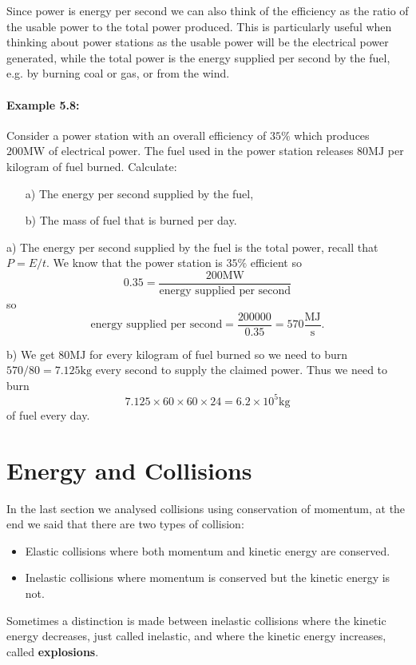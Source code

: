 \documentclass[a4paper,12pt]{book}
\begin{document}
Since power is energy per second we can also think of the efficiency as the ratio of the usable power to the total power produced. This is particularly useful when thinking about power stations as the usable power will be the electrical power generated, while the total power is the energy supplied per second by the fuel, e.g. by burning coal or gas, or from the wind.

\paragraph{Example 5.8:} Consider a power station with an overall efficiency of $35\%$ which produces $200\text{MW}$ of electrical power. The fuel used in the power station releases $80\text{MJ}$ per kilogram of fuel burned. Calculate:
\begin{itemize}
\setlength{\itemsep}{-5pt}
    \item[a)] The energy per second supplied by the fuel,
    \item[b)] The mass of fuel that is burned per day.
\end{itemize} 

a) The energy per second supplied by the fuel is the total power, recall that $P=E/t$. We know that the power station is $35\%$ efficient so
\begin{equation*}
0.35=\frac{200\text{MW}}{\text{energy supplied per second}}
\end{equation*}
so
\begin{equation*}
\text{energy supplied per second}=\frac{200000}{0.35}=570\frac{\text{MJ}}{\text{s}}.
\end{equation*}

b) We get $80\text{MJ}$ for every kilogram of fuel burned so we need to burn $570/80=7.125\text{kg}$ every second to supply the claimed power. Thus we need to burn 
\begin{equation*}
7.125\times 60\times 60\times 24=6.2\times10^{5}\text{kg}
\end{equation*}
of fuel every day.


\section{Energy and Collisions}
In the last section we analysed collisions using conservation of momentum, at the end we said that there are two types of collision:
\begin{itemize}
\setlength{\itemsep}{-5pt}
    \item Elastic collisions where both momentum and kinetic energy are conserved.
    \item Inelastic collisions where momentum is conserved but the kinetic energy is not.
\end{itemize} 
Sometimes a distinction is made between inelastic collisions where the kinetic energy decreases, just called inelastic, and where the kinetic energy increases, called \textbf{explosions}. \\
\end{document}
